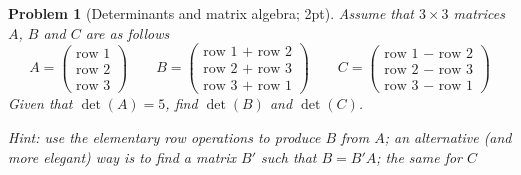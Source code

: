 \documentclass[12pt,a4]{article}
\newtheorem{problem}{Problem}
\begin{document}
\begin{problem}[Determinants and matrix algebra; 2pt]\rm
	Assume that $3 \times 3$ matrices $A$, $B$ and $C$ are as follows
	\[
	A = \begin{pmatrix}\textrm{row~1} \\  \textrm{row~2} \\  \textrm{row~3}\end{pmatrix}
	\qquad
	B = \begin{pmatrix}
	\textrm{row~1 + row 2} \\  \textrm{row~2 + row 3} \\  \textrm{row~3 + row 1}
	\end{pmatrix}
	\qquad
	C = \begin{pmatrix}
	\textrm{row~1 $-$ row 2} \\  \textrm{row~2 $-$ row 3}
	\\  \textrm{row~3 $-$ row 1}
	\end{pmatrix}
	\]
	Given that $\det(A) = 5$, find $\det(B)$ and $\det(C)$.
	
	    \small{\textsf{Hint: use the elementary row operations to produce $B$ from $A$; an alternative (and more elegant) way is to find a matrix $B'$ such that $B=B'A$; the same for $C$}}
\end{problem}
\end{document}
